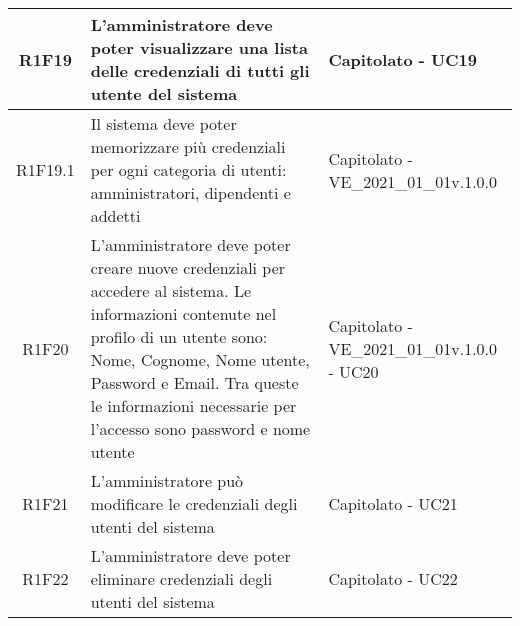 \begin{center}
\begin{longtable}{|c|p{10cm}|p{4cm}|}
		R1F19&L'amministratore deve poter visualizzare una lista delle credenziali di tutti gli utente del sistema	& Capitolato - UC19	\\
		\hline
		R1F19.1&Il sistema deve poter memorizzare più credenziali per ogni categoria di utenti: amministratori, dipendenti e addetti	& Capitolato - VE\_2021\_01\_01v.1.0.0	\\
		\hline
		R1F20&L'amministratore deve poter creare nuove credenziali per accedere al sistema. Le informazioni contenute nel profilo di un utente sono: Nome, Cognome, Nome utente, Password e Email. Tra queste le informazioni necessarie per l'accesso sono password e nome utente	& Capitolato - VE\_2021\_01\_01v.1.0.0 - UC20	\\
		\hline
		R1F21&L'amministratore può modificare le credenziali degli utenti del sistema	&Capitolato - UC21	\\
		\hline
		R1F22&L'amministratore deve poter eliminare credenziali degli utenti del sistema	& Capitolato - UC22	\\
		\hline
		

\end{longtable}
\end{center}
